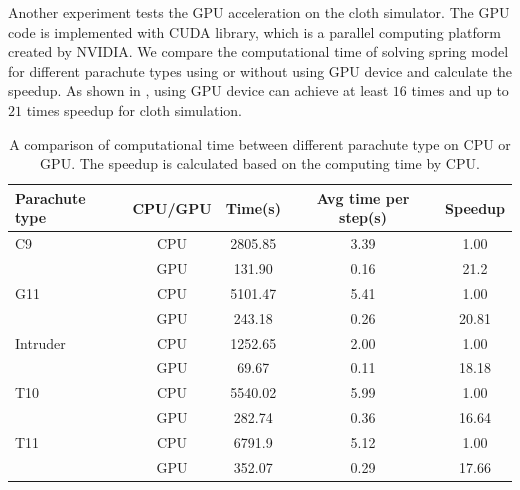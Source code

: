 Another experiment tests the GPU acceleration on the cloth simulator. The GPU 
code is implemented with CUDA library, which is a parallel computing platform 
created by NVIDIA. We compare the computational time of solving spring model 
for different parachute types using or without using GPU device and calculate 
the speedup. As shown in , using GPU device can achieve at 
least $16$ times and up to $21$ times speedup for cloth simulation.  

\begin{table}[!htbp]\center
\small
\begin{tabular}{lcccc}
\hline\hline
Parachute type & CPU/GPU & Time(s) & Avg time per step(s) & Speedup\\
\hline
C9 & CPU & 2805.85 & 3.39 & 1.00 \\
{} & GPU & 131.90 & 0.16  & 21.2 \\

\hline
G11 & CPU & 5101.47 & 5.41 & 1.00 \\
{} & GPU & 243.18 & 0.26 & 20.81 \\

\hline
Intruder & CPU & 1252.65 & 2.00 & 1.00 \\
{} & GPU & 69.67 & 0.11 & 18.18 \\

\hline
T10 	& CPU & 5540.02 & 5.99 & 1.00 \\
{} & GPU & 282.74 & 0.36 & 16.64\\

\hline
T11 & CPU & 6791.9 & 5.12 & 1.00 \\
{} & GPU & 352.07 & 0.29 & 17.66\\
\hline
\end{tabular}
\caption{A comparison of computational time between different parachute type on CPU or GPU. The speedup is calculated based on the computing time by CPU. \label{gpu_speedup}}
\end{table}